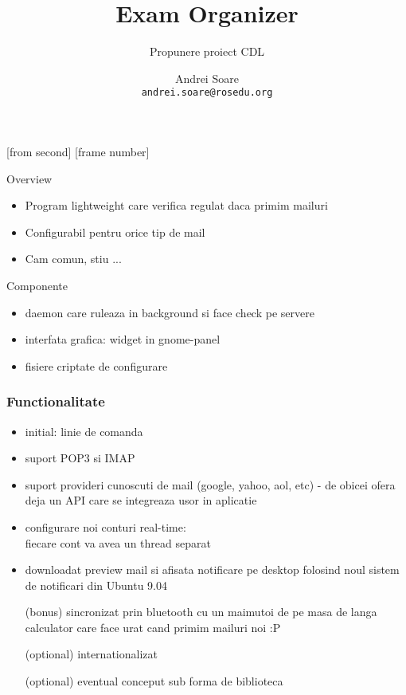 \documentclass{beamer}
\title{Exam Organizer}
\subtitle{Propunere proiect CDL}
\institute{ROSEdu}
\author{Andrei Soare \\ \texttt{andrei.soare@rosedu.org}}
\begin{document}
[from second]
[frame number]

\frame{\titlepage}

\begin{frame}{Overview}
\begin{itemize}
\item Program lightweight care verifica regulat daca primim mailuri
\item Configurabil pentru orice tip de mail\vspace{1cm}\pause
\item Cam comun, stiu ...
\end{itemize}
\end{frame}

\begin{frame}{Componente}
\begin{itemize}
\item daemon care ruleaza in background si face check pe servere
\item interfata grafica: widget in gnome-panel
\item fisiere criptate de configurare
\end{itemize}
\end{frame}

\begin{frame}[allowframebreaks]
\frametitle{Functionalitate}
\begin{itemize}
\item initial: linie de comanda
\item suport POP3 si IMAP
\item suport provideri cunoscuti de mail (google, yahoo, aol, etc) - de obicei
ofera deja un API care se integreaza usor in aplicatie
\item configurare noi conturi real-time:\\fiecare cont va avea un thread separat
\item downloadat preview mail si afisata notificare pe desktop folosind noul sistem
de notificari din Ubuntu 9.04\framebreak
\item [(bonus)] sincronizat prin bluetooth cu un maimutoi de pe masa de langa calculator
care face urat cand primim mailuri noi :P
\item [(optional)]internationalizat
\item [(optional)] eventual conceput sub forma de biblioteca
\end{itemize}
\end{frame}
\end{document}
